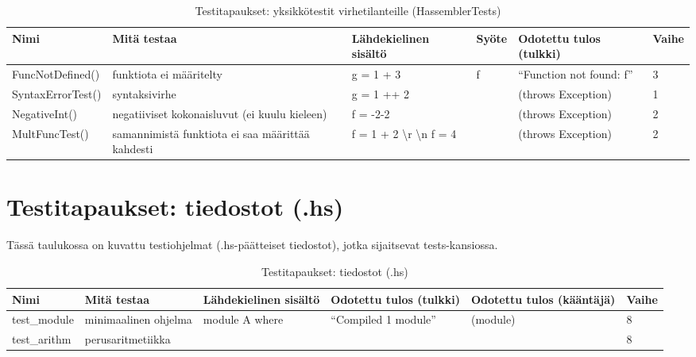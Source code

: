 \documentclass[11pt]{article} %
\begin{document}
\begin{table}[!htbp] %
\caption{Testitapaukset: yksikkötestit virhetilanteille (HassemblerTests)}
\begin{tabular}{|p{3cm}|p{}|p{3cm}|p{}|p{3cm}|p{}|}
\hline
\textbf{Nimi} & \textbf{Mitä testaa} & \textbf{Lähdekielinen sisältö} & \textbf{Syöte}  & \textbf{Odotettu tulos (tulkki)}  & \textbf{Vaihe} \\ \hline
 FuncNotDefined()  & funktiota ei määritelty   &  g = 1 + 3       &  f       &  ``Function not found: f''   &  3            \\ \hline
 SyntaxErrorTest()     & syntaksivirhe   &  g = 1 ++ 2    &           &   (throws Exception)   &    1     \\ \hline
NegativeInt()              & negatiiviset kokonaisluvut (ei kuulu kieleen)   &  f = -2-2   & &   (throws Exception)                                     &  2              \\ \hline       
MultFuncTest()      & samannimistä funktiota ei saa määrittää kahdesti   & f = 1 + 2 \textbackslash r \textbackslash n f = 4   &        &  (throws Exception)    &    2                                               \\ \hline       
\end{tabular}
\end{table}

\pagebreak

\section{Testitapaukset: tiedostot (.hs)}

Tässä taulukossa on kuvattu testiohjelmat (.hs-päätteiset tiedostot), jotka sijaitsevat tests-kansiossa.

\begin{table}[!htbp] %
\caption{Testitapaukset: tiedostot (.hs)}
\begin{tabular}{|p{}|p{}|p{}|p{2cm}|p{3cm}|p{}|}
\hline
\textbf{Nimi} & \textbf{Mitä testaa} & \textbf{Lähdekielinen sisältö} & \textbf{Odotettu tulos (tulkki)} & \textbf{Odotettu tulos (kääntäjä)} & \textbf{Vaihe} \\ \hline
test\_module  &  minimaalinen ohjelma  & module A where &  ``Compiled 1 module''    &    (module)    & 8   \\ \hline
 test\_arithm     & perus\-aritmetiikka         &  &                                  &                                   &   8       \\ \hline


\end{tabular}
\end{table}
\end{document}
